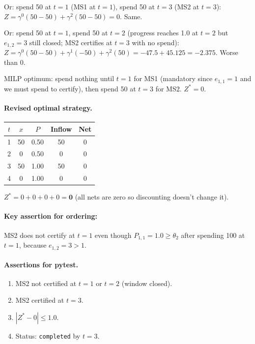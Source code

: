 \documentclass[11pt, a4paper]{article}
\begin{document}
Or: spend 50 at $t=1$ (MS1 at $t=1$), spend 50 at $t=3$ (MS2 at $t=3$):
$Z=\gamma^0(50-50)+\gamma^2(50-50)=0$. Same.

Or: spend 50 at $t=1$, spend 50 at $t=2$ (progress reaches 1.0 at $t=2$
but $e_{1,2}=3$ still closed; MS2 certifies at $t=3$ with no spend):
$Z=\gamma^0(50-50)+\gamma^1(-50)+\gamma^2(50)=-47.5+45.125=-2.375$.
Worse than 0.

MILP optimum: spend nothing until $t=1$ for MS1 (mandatory since
$e_{1,1}=1$ and we must spend to certify), then spend 50 at $t=3$ for
MS2. $Z^*=0$.

\paragraph{Revised optimal strategy.}
\begin{center}
\begin{tabular}{ccccc}
\toprule
$t$ & $x$ & $P$ & Inflow & Net\\
\midrule
1 & 50 & 0.50 & 50 & $0$\\
2 &  0 & 0.50 &  0 & $0$\\
3 & 50 & 1.00 & 50 & $0$\\
4 &  0 & 1.00 &  0 & $0$\\
\bottomrule
\end{tabular}
\end{center}

$Z^*=0+0+0+0=\mathbf{0}$ (all nets are zero so discounting doesn't
change it).

\paragraph{Key assertion for ordering:} MS2 does not certify at $t=1$
even though $P_{1,1}=1.0\geq\theta_2$ after spending 100 at $t=1$,
because $e_{1,2}=3>1$.

\paragraph{Assertions for pytest.}
\begin{enumerate}[label=A\arabic*.]
  \item MS2 not certified at $t=1$ or $t=2$ (window closed).
  \item MS2 certified at $t=3$.
  \item $|Z^*-0|\leq1.0$.
  \item Status: \texttt{completed} by $t=3$.
\end{enumerate}
\end{document}
